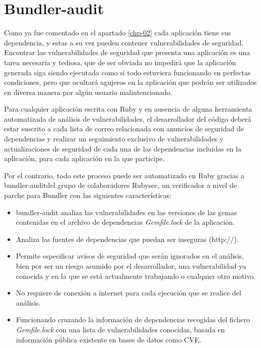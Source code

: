 

\section{Bundler-audit}

Como ya fue comentado en el apartado \ref{chp-02} cada aplicación tiene sus dependencia, y estas a su vez pueden contener vulnerabilidades de seguridad. Encontrar las vulnerabilidades de seguridad que presenta una aplicación es una tarea necesaria y tediosa, que de ser obviada no impedirá que la aplicación generada siga siendo ejecutada como si todo estuviera funcionando en perfectas condiciones, pero que ocultará agujeros en la aplicación que podrán ser utilizados en diversa manera por algún usuario malintencionado.

Para cualquier aplicación escrita con Ruby y en ausencia de alguna herramienta automatizada de análisis de vulnerabilidades, el desarrollador del código deberá estar suscrito a cada lista de correo relacionada con anuncios de seguridad de dependencias y realizar un seguimiento exclusivo de vulnerabilidades y actualizaciones de seguridad de cada una de las dependencias incluidas en la aplicación, para cada aplicación en la que participe\cite{prescott2015}.

Por el contrario, todo este proceso puede ser automatizado en Ruby gracias a bundler-audit\cite{bundleaudit2017}del grupo de colaboradores Rubysec, un verificador a nivel de parche para Bundler con las siguientes características:

\begin{itemize}
	\item bundler-audit analiza las vulnerabilidades en las versiones de las gemas contenidas en el archivo de dependencias \textit{Gemfile.lock} de la aplicación.
	\item Analiza las fuentes de dependencias que puedan ser inseguras (http://).
	\item Permite especificar avisos de seguridad que serán ignorados en el análisis, bien por ser un riesgo asumido por el desarrollador, una vulnerabilidad ya conocida y en la que se está actualmente trabajando o cualquier otro motivo.
	\item No requiere de conexión a internet para cada ejecución que se realice del análisis.
	\item Funcionando cruzando la información de dependencias recogidas del fichero \textit{Gemfile.lock} con una lista de vulnerabilidades conocidas\cite{advisorydb2017}, basada en información pública existente en bases de datos como \gls{CVE}.
\end{itemize}

